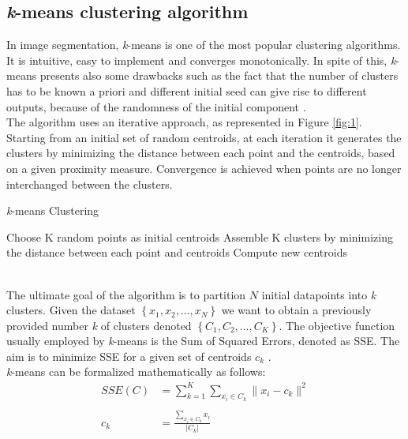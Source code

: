 \documentclass{usiinftr}
\begin{document}
\subsection{\textit{k}-means clustering algorithm} 
In image segmentation, \textit{k}-means is one of the most popular clustering algorithms. It is intuitive, easy to implement and converges monotonically. In spite of this, \textit{k}-means presents also some drawbacks such as the fact that the number of clusters has to be known a priori and different initial seed can give rise to different outputs, because of the randomness of the initial component \cite{10}. \\
The algorithm uses an iterative approach, as represented in Figure \ref{fig:1}. Starting from an initial set of random centroids, at each iteration it generates the clusters by minimizing the distance between each point and the centroids, based on a given proximity measure. Convergence is achieved when points are no longer interchanged between the clusters.
\begin{algorithm}
	\caption{\textit{k}-means Clustering}\label{kmeans}
	\begin{algorithmic}[1]
		\State Choose K random points as initial centroids 
		\State Assemble K clusters by minimizing the distance between each point and centroids
		\State Compute new centroids
		\EndWhile
		\EndProcedure
	\end{algorithmic}
\end{algorithm} \\
\noindent
The ultimate goal of the algorithm is to partition $N$ initial datapoints into \textit{k} clusters. Given the dataset $\left\lbrace x_1, x_2, \dots, x_N \right\rbrace$ we want to obtain a previously provided number \textit{k} of clusters denoted $\left\lbrace C_1, C_2, \dots, C_K \right\rbrace $. The objective function usually employed by \textit{k}-means is the Sum of Squared Errors, denoted as SSE. The aim  is to minimize SSE for a given set of centroids $c_k$ \cite{11}. \\
\textit{k}-means can be  formalized mathematically as follows: 
\begin{equation*}
\begin{split}
SSE(C) &= \sum_{k=1}^{K} \sum_{x_i \in C_k} \| x_i - c_k\|^2 \\ \\
c_k &= \frac{\sum\limits_{x_i \in C_k} x_i}{|C_k|}
\end{split}
\end{equation*}
\end{document}
